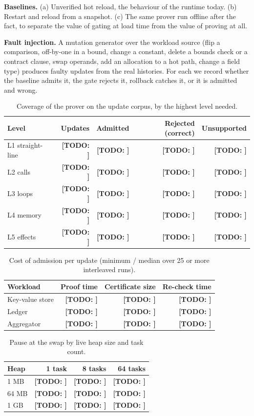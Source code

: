 \documentclass[10pt,twocolumn]{article}
\newcommand{\todo}[1]{{\color{red}\textbf{[TODO: #1]}}}
\begin{document}
\textbf{Baselines.} (a) Unverified hot reload, the behaviour of the runtime today. (b) Restart and reload from a snapshot. (c) The same prover run offline after the fact, to separate the value of gating at load time from the value of proving at all.

\textbf{Fault injection.} A mutation generator over the workload source (flip a comparison, off-by-one in a bound, change a constant, delete a bounds check or a contract clause, swap operands, add an allocation to a hot path, change a field type) produces faulty updates from the real histories. For each we record whether the baseline admits it, the gate rejects it, rollback catches it, or it is admitted and wrong.

\begin{table}[t]\centering\small
\begin{tabular}{lrrrr}\toprule
Level & Updates & Admitted & Rejected (correct) & Unsupported \\
\midrule
L1 straight-line & \todo{} & \todo{} & \todo{} & \todo{} \\
L2 calls & \todo{} & \todo{} & \todo{} & \todo{} \\
L3 loops & \todo{} & \todo{} & \todo{} & \todo{} \\
L4 memory & \todo{} & \todo{} & \todo{} & \todo{} \\
L5 effects & \todo{} & \todo{} & \todo{} & \todo{} \\
\bottomrule
\end{tabular}
\caption{Coverage of the prover on the update corpus, by the highest level needed.}\label{tab-coverage}
\end{table}
\begin{table}[t]\centering\small
\begin{tabular}{lrrr}\toprule
Workload & Proof time & Certificate size & Re-check time \\
\midrule
Key-value store & \todo{} & \todo{} & \todo{} \\
Ledger & \todo{} & \todo{} & \todo{} \\
Aggregator & \todo{} & \todo{} & \todo{} \\
\bottomrule
\end{tabular}
\caption{Cost of admission per update (minimum / median over 25 or more interleaved runs).}\label{tab-cost}
\end{table}
\begin{table}[t]\centering\small
\begin{tabular}{lrrr}\toprule
Heap & 1 task & 8 tasks & 64 tasks \\
\midrule
1 MB & \todo{} & \todo{} & \todo{} \\
64 MB & \todo{} & \todo{} & \todo{} \\
1 GB & \todo{} & \todo{} & \todo{} \\
\bottomrule
\end{tabular}
\caption{Pause at the swap by live heap size and task count.}\label{tab-pause}
\end{table}
\end{document}
